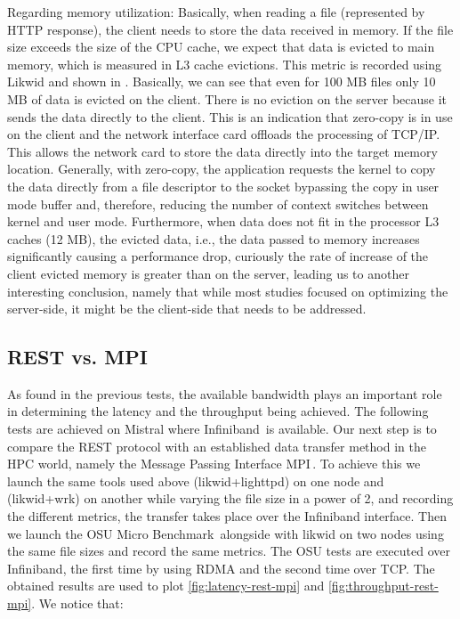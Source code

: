\documentclass[runningheads]{llncs}
\begin{document}
Regarding memory utilization: Basically, when reading a file (represented by HTTP response), the client needs to store the data received in memory. If the file size exceeds the size of the CPU cache, we expect that data is evicted to main memory, which is measured in L3 cache evictions. This metric is recorded using Likwid and shown in . Basically, we can see that even for 100 MB files only 10 MB of data is evicted on the client. There is no eviction on the server because it sends the data directly to the client. This is an indication that zero-copy \cite{zerocopy} is in use on the client and the network interface card offloads the processing of TCP/IP. This allows  the network card to store the data directly into the target memory location. Generally, with zero-copy, the application requests the kernel to copy the data directly from a file descriptor to the socket bypassing the copy in user mode buffer and, therefore, reducing the number of context switches between kernel and user mode.
Furthermore, when data does not fit in the processor L3 caches (12 MB), the evicted data, i.e., the data passed to memory increases significantly causing a performance drop, curiously the rate of increase of the client evicted memory is greater than on the server, leading us to another interesting conclusion, namely that while most studies focused on optimizing the server-side, it might be the client-side that needs to be addressed.

\subsection{REST vs. MPI}\label{subsec:tcpib}
As found in the previous tests, the available bandwidth plays an important role in determining the latency and the throughput being achieved. The following tests are achieved on Mistral where Infiniband\,\cite{Infiniband} is available.
Our next step is to compare the REST protocol with an established data transfer method in the HPC world, namely the Message Passing Interface MPI\,\cite{MPI}.
To achieve this we launch the same tools used above (likwid+lighttpd) on one node and (likwid+wrk) on another while varying the file size in a power of 2, and recording the different metrics, the transfer takes place over the Infiniband interface.
Then we launch the OSU Micro Benchmark\,\cite{osumicrobenchmark} alongside with likwid on two nodes using the same file sizes and record the same metrics. The OSU tests are executed over Infiniband, the first time by using RDMA and the second time over TCP.
The obtained results are used to plot \cref{fig:latency-rest-mpi} and \cref{fig:throughput-rest-mpi}. We notice that:
\end{document}
